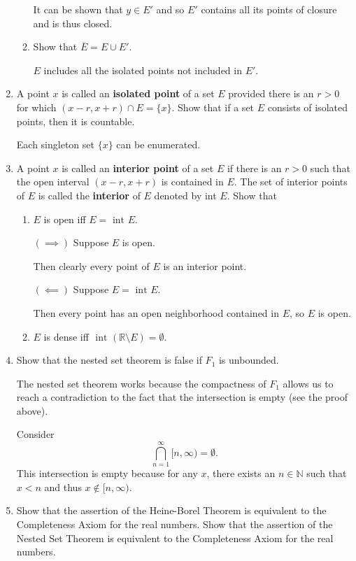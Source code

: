 \begin{enumerate}
\begin{enumerate}[label=(\roman*),align=left]
		It can be shown that $y \in E'$ and so $E'$ contains all its points of closure and is thus closed.
        \item Show that $\overline E = E \cup E'.$\par
        $E$ includes all the isolated points not included in $E'$. 
    \end{enumerate}
	\item A point $x$ is called an \textbf{ isolated point} of a set $E$ provided there is an $r>0$ for which $(x-r,x+r)\cap E = \{x\}.$ Show that if a set $E$ consists of isolated points, then it is countable.\par
	Each singleton set $\{x\}$ can be enumerated.
	\item A point $x$ is called an \textbf{interior point} of a set $E$ if there is an $r>0$ such that the open interval $(x-r,x+r)$ is contained in $E$. The set of interior points of $E$ is called the \textbf{interior} of $E$ denoted by int $E$. Show that
	\begin{enumerate}[label=(\roman*),align=left]
        \item $E$ is open iff $E = \text{ int } E$.\par
        $(\implies)$ Suppose $E$ is open.\par
		Then clearly every point of $E$ is an interior point.
		\par
		$(\impliedby)$ Suppose $E = \text{ int } E$.\par
		Then every point has an open neighborhood contained in $E$, so $E$ is open.
        \item $E$ is dense iff $ \text{ int } (\mathbb{R} \setminus E)= \emptyset$.
    \end{enumerate}
	\item Show that the nested set theorem is false if $F_1$ is unbounded.\par
	The nested set theorem works because the compactness of $F_1$ allows us to reach a contradiction to the fact that the intersection is empty (see the proof above).\par
	Consider
	\[
	\bigcap_{n=1}^\infty [n, \infty) = \emptyset.
	\]
	This intersection is empty because for any $x$, there exists an $n \in \mathbb{N}$ such that $x < n$ and thus $x \notin [n,\infty)$.
	\item Show that the assertion of the Heine-Borel Theorem is equivalent to the Completeness Axiom for the real numbers. Show that the assertion of the Nested Set Theorem is equivalent to the Completeness Axiom for the real numbers.\par

\end{enumerate}
